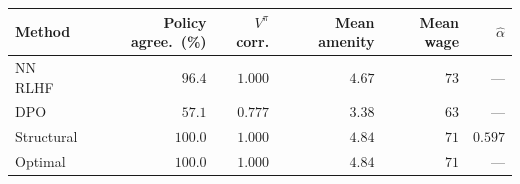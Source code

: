 \begin{tabular}{lrrrrr}
\hline
Method & Policy agree.~(\%) & $V^\pi$ corr. & Mean amenity & Mean wage & $\hat{\alpha}$ \\
\hline
NN RLHF & $96.4$ & $1.000$ & $4.67$ & $73$ & --- \\
DPO & $57.1$ & $0.777$ & $3.38$ & $63$ & --- \\
Structural & $100.0$ & $1.000$ & $4.84$ & $71$ & $0.597$ \\
\hline
Optimal & $100.0$ & $1.000$ & $4.84$ & $71$ & --- \\
\hline
\end{tabular}
